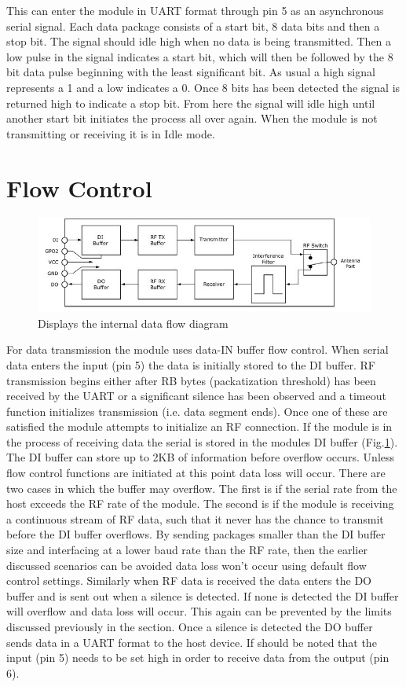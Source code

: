 \documentclass[paper=a4, fontsize=11pt]{scrartcl}
\numberwithin{equation}{section}		%
\numberwithin{figure}{section}			%
\numberwithin{table}{section}				%
\begin{document}
This can enter the module in UART format through pin 5 as an asynchronous serial signal. Each data package consists of a start bit, 8 data bits and then a stop bit. The signal should idle high when no data is being transmitted. Then a low pulse in the signal indicates a start bit, which will then be followed by the 8 bit data pulse beginning with the least significant bit. As usual a high signal represents a 1 and a low indicates a 0. Once 8 bits has been detected the signal is returned high to indicate a stop bit. From here the signal will idle high until another start bit initiates the process all over again. When the module is not transmitting or receiving it is in Idle mode.
\section{Flow Control}

\begin{figure}[H]
\centering
\includegraphics[width=0.9\linewidth]{flow}
\caption{ Displays the internal data flow diagram \cite{man}}
\label{flow}
\end{figure}
For data transmission the module uses data-IN buffer flow control. When serial data enters the input (pin 5) the data is initially stored to the DI buffer. RF transmission begins either after RB bytes (packatization threshold) has been received by the UART or a significant silence has been observed and a timeout function initializes transmission (i.e. data segment ends). Once one of these are satisfied the module attempts to initialize an RF connection. If the module is in the process of receiving data the serial is stored in the modules DI buffer (Fig.\ref{flow}). The DI buffer can store up to 2KB of information before overflow occurs. Unless flow control functions are initiated at this point data loss will occur. There are two cases in which the buffer may overflow. The first is if the serial rate from the host exceeds the RF rate of the module. The second is if the module is receiving a continuous stream of RF data, such that it never has the chance to transmit before the DI buffer overflows. By sending packages smaller than the DI buffer size and interfacing at a lower baud rate than the RF rate, then the earlier discussed scenarios can be avoided data loss won't occur using default flow control settings. 
Similarly when RF data is received the data enters the DO buffer and is sent out when a silence is detected. If none is detected the DI buffer will overflow and data loss will occur. This again can be prevented by the limits discussed previously in the section. Once a silence is detected the DO buffer sends data in a UART format to the host device. If should be noted that the input (pin 5) needs to be set high in order to receive data from the output (pin 6).
\end{document}
